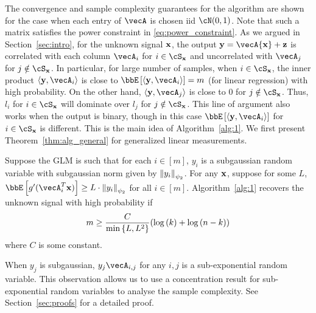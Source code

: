 
The convergence and sample complexity guarantees for the algorithm are shown for the case when each entry of $\vecA$ is chosen iid $\cN(0,1)$. Note that such a matrix satisfies the power constraint in \eqref{eq:power_constraint}. As we argued in Section~\ref{sec:intro}, for the unknown signal $\mathbf{x}$,  the output $\by = \vecA{\bx}+\bz$ is correlated with each column $\vecA_i$ for $i\in \cS_{\bx}$ and uncorrelated with $\vecA_j$ for $j\notin \cS_{\bx}$. In particular, for large number of samples, when $i\in \cS_{\bx}$, the inner product $\ipr{\by}{\vecA_i}$ is close to $\bbE\insq{\ipr{\by}{\vecA_i}} = m$ (for linear regression) with high probability. On the other hand, $\ipr{\by}{\vecA_j}$ is close to $0$ for $j\notin \cS_{\bx}$.  Thus, $l_i$ for $i\in \cS_{\bx}$ will dominate over $l_j$ for $j\notin \cS_{\bx}$. This line of argument also works when the output is binary, though in this case $\bbE\insq{\ipr{{\by}}{\vecA_i}}$ for $i\in \cS_{\bx}$ is different. 
This is the main idea of Algorithm~\ref{alg:1}. We first present Theorem~\ref{thm:alg_general} for generalized linear measurements.
\begin{theorem}\label{thm:alg_general}
Suppose the GLM is such that for each $i\in [m]$, $y_i$ is a subgaussian random variable with subgaussian norm given by $\left\lVert{y_i}\right\rVert_{\psi_2}$. For any $\mathbf{x}$, suppose for some $L$, $\bbE\insq{g'(\vecA_i^T\bx)}\geq L\cdot
\normi{{y_i}}_{\psi_2}$   for all $i\in [m]$. Algorithm~\ref{alg:1} recovers the unknown signal with high probability if 
\begin{align}
m \geq \frac{C}{{\min\left\{L, L^2\right\}}}(\log\left(k\right)+\log\left(n-k\right))\label{eq: alg_bound}
\end{align} where $C$ is some constant.
\end{theorem}
When $y_j$ is subgaussian, $y_j\vecA_{i,j}$ for any $i,j$ is a sub-exponential random variable. This observation allows us to use a concentration result for sub-exponential random variables to analyse the sample complexity. See Section~\ref{sec:proofs} for a detailed proof. 

